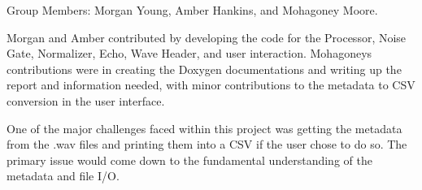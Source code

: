
\begin{DoxyEnumerate}
\item Group Members\+: Morgan Young, Amber Hankins, and Mohagoney Moore.
\item Morgan and Amber contributed by developing the code for the Processor, Noise Gate, Normalizer, Echo, Wave Header, and user interaction. Mohagoney\textquotesingle{}s contributions were in creating the Doxygen documentations and writing up the report and information needed, with minor contributions to the metadata to C\+SV conversion in the user interface.
\item 
\item One of the major challenges faced within this project was getting the metadata from the .wav files and printing them into a C\+SV if the user chose to do so. The primary issue would come down to the fundamental understanding of the metadata and file I/O. 
\end{DoxyEnumerate}